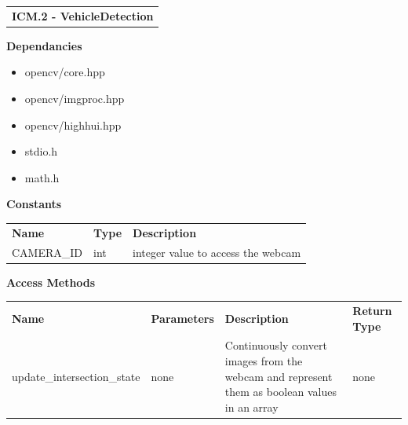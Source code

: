 \documentclass [10pt]{article}
\begin{document}
\begin{longtable}{p{}}
\rowcolor{subsectionC}\textbf{ICM.2 - VehicleDetection} \\
\end{longtable}
  

\textbf{Dependancies } 

\begin{itemize}
    \itemsep 0pt
    \item opencv/core.hpp
    \item opencv/imgproc.hpp
    \item opencv/highhui.hpp
    \item stdio.h
    \item math.h 
\end{itemize}

\textbf{Constants}
\begin{longtable}{ p{ }  p{ } p{}} \\ 
\rowcolor{tableCell} \textbf{Name} & \textbf{Type} & \textbf{Description} \\ \rowcolor{tableCell}CAMERA\_ID&int&integer value to access the webcam\\ 
\end{longtable}










\textbf{Access Methods}


\begin{longtable}{ p{ }  p{ } p{} p{}} \\ 

\rowcolor{tableCell} \textbf{Name} & \textbf{Parameters} & \textbf{Description} &\textbf{Return Type} \\
\rowcolor{tableCell}  update\_intersection\_state &none  &Continuously convert images from the webcam and represent them as boolean values in an array&none





\end{longtable}
\end{document}
